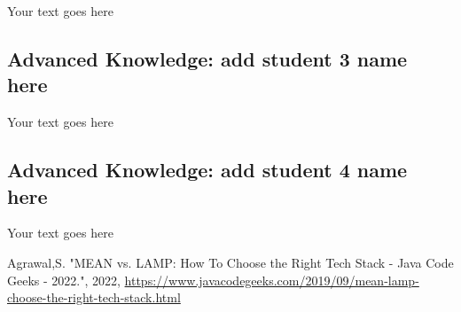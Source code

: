 \documentclass[a4paper, 11pt]{report}
\begin{document}
Your text goes here

\subsection{Advanced Knowledge: add student 3 name here}

Your text goes here

\subsection{Advanced Knowledge: add student 4 name here}

Your text goes here




\newpage



{ Agrawal,S.  "MEAN vs. LAMP: How To Choose the Right Tech Stack - Java Code Geeks - 2022.", 2022, {\url{https://www.javacodegeeks.com/2019/09/mean-lamp-choose-the-right-tech-stack.html}}
}
\end{document}
